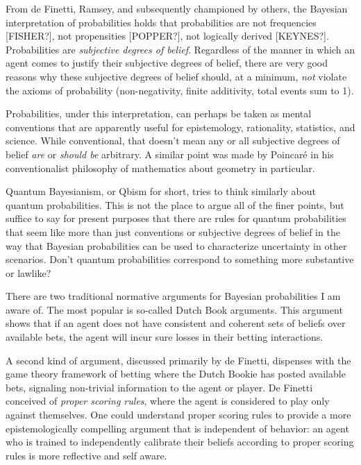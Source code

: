From de Finetti, Ramsey, and subsequently championed by others, the Bayesian interpretation of probabilities holds that probabilities are not frequencies [FISHER?], not propensities [POPPER?], not logically derived [KEYNES?].  Probabilities are \emph{subjective degrees of belief}. Regardless of the manner in which an agent comes to justify their subjective degrees of belief, there are very good reasons why these subjective degrees of belief should, at a minimum, \emph{not} violate the axioms of probability (non-negativity, finite additivity, total events sum to 1).

Probabilities, under this interpretation, can perhaps be taken as mental conventions that are apparently useful for epistemology, rationality, statistics, and science.  While conventional, that doesn't mean any or all subjective degrees of belief \emph{are} or \emph{should be} arbitrary.  A similar point was made by Poincar\'e in his conventionalist philosophy of mathematics about geometry in particular.  

Quantum Bayesianism, or Qbism for short, tries to think similarly about quantum probabilities.  This is not the place to argue all of the finer points, but suffice to say for present purposes that there are rules for quantum probabilities that seem like more than just conventions or subjective degrees of belief in the way that Bayesian probabilities can be used to characterize uncertainty in other scenarios.  Don't quantum probabilities correspond to something more substantive or lawlike?

There are two traditional normative arguments for Bayesian probabilities I am aware of.  The most popular is so-called Dutch Book arguments.  This argument shows that if an agent does not have consistent and coherent sets of beliefs over available bets, the agent will incur sure losses in their betting interactions.

A second kind of argument, discussed primarily by de Finetti, dispenses with the game theory framework of betting where the Dutch Bookie has posted available bets, signaling non-trivial information to the agent or player.  De Finetti conceived of \emph{proper scoring rules}, where the agent is considered to play only against themselves.  One could understand proper scoring rules to provide a more epistemologically compelling argument that is independent of behavior: an agent who is trained to independently calibrate their beliefs according to proper scoring rules is more reflective and self aware.  

